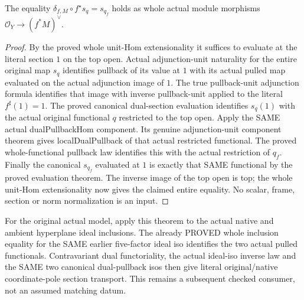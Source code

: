 \begin{theorem}
\label{thm:seven-canonical-dual-section-pullback}
\leanok
{}
The equality $\delta_{f,M}\circ f^\star s_q=s_{q_f}$ holds as whole actual
module morphisms $\mathcal O_Y\to(f^*M)^\vee$.
\end{theorem}
\begin{proof}
By the proved whole unit-Hom extensionality it suffices to evaluate at
the literal section $1$ on the top open. Actual adjunction-unit
naturality for the entire original map $s_q$ identifies pullback of its
value at $1$ with its actual pulled map evaluated on the actual
adjunction image of $1$. The true pullback-unit adjunction formula
identifies that image with inverse pullback-unit applied to the literal
$f^\sharp(1)=1$. The proved canonical dual-section evaluation identifies
$s_q(1)$ with the actual original functional $q$ restricted to the top
open. Apply the SAME actual dualPullbackHom component. Its genuine
adjunction-unit component theorem gives localDualPullback of that actual
restricted functional. The proved whole-functional pullback law identifies
this with the actual restriction of $q_f$. Finally the canonical
$s_{q_f}$ evaluated at $1$ is exactly that SAME functional by the proved
evaluation theorem. The inverse image of the top open is top; the whole
unit-Hom extensionality now gives the claimed entire equality. No scalar,
frame, section or norm normalization is an input.
\end{proof}

For the original actual model, apply this theorem to the actual native
and ambient hyperplane ideal inclusions. The already PROVED whole
inclusion equality for the SAME earlier five-factor ideal iso identifies
the two actual pulled functionals. Contravariant dual functoriality,
the actual ideal-iso inverse law and the SAME two canonical dual-pullback
isos then give literal original/native coordinate-pole section transport.
This remains a subsequent checked consumer, not an assumed matching datum.

